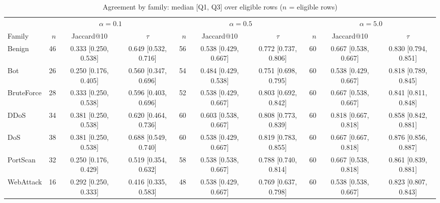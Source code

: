 \begin{table}[t]
\centering
\caption{Agreement by family: median [Q1, Q3] over eligible rows ($n$ = eligible rows)}
\label{tab:agree_family}
\footnotesize
\setlength{\tabcolsep}{3pt}
\begin{tabular}{@{}l rcc rcc rcc@{}}
\toprule
 & \multicolumn{3}{c}{$\alpha=0.1$} & \multicolumn{3}{c}{$\alpha=0.5$} & \multicolumn{3}{c}{$\alpha=5.0$}\\ %
\cmidrule(lr){2-4}\cmidrule(lr){5-7}\cmidrule(l){8-10}
Family & $n$ & Jaccard@10 & $\tau$ & $n$ & Jaccard@10 & $\tau$ & $n$ & Jaccard@10 & $\tau$\\
\midrule
Benign & 46 & 0.333 [0.250, 0.538] & 0.649 [0.532, 0.716] & 56 & 0.538 [0.429, 0.667] & 0.772 [0.737, 0.806] & 60 & 0.667 [0.538, 0.667] & 0.830 [0.794, 0.851]\\ %
Bot & 26 & 0.250 [0.176, 0.405] & 0.560 [0.347, 0.696] & 54 & 0.484 [0.429, 0.538] & 0.751 [0.698, 0.795] & 60 & 0.538 [0.429, 0.667] & 0.818 [0.789, 0.845]\\ %
BruteForce & 28 & 0.333 [0.250, 0.538] & 0.596 [0.403, 0.696] & 52 & 0.538 [0.429, 0.667] & 0.803 [0.692, 0.842] & 60 & 0.667 [0.538, 0.667] & 0.841 [0.811, 0.848]\\ %
DDoS & 34 & 0.381 [0.250, 0.538] & 0.620 [0.464, 0.736] & 60 & 0.603 [0.538, 0.667] & 0.808 [0.773, 0.839] & 60 & 0.818 [0.667, 0.818] & 0.858 [0.842, 0.881]\\ %
DoS & 38 & 0.381 [0.250, 0.538] & 0.688 [0.549, 0.740] & 60 & 0.538 [0.429, 0.667] & 0.819 [0.783, 0.855] & 60 & 0.667 [0.667, 0.818] & 0.876 [0.856, 0.887]\\ %
PortScan & 32 & 0.250 [0.176, 0.429] & 0.519 [0.354, 0.632] & 58 & 0.538 [0.538, 0.667] & 0.788 [0.740, 0.814] & 60 & 0.667 [0.538, 0.818] & 0.861 [0.839, 0.881]\\ %
WebAttack & 16 & 0.292 [0.250, 0.333] & 0.416 [0.335, 0.583] & 48 & 0.538 [0.429, 0.667] & 0.769 [0.637, 0.798] & 60 & 0.538 [0.538, 0.667] & 0.823 [0.807, 0.843]\\ %
\bottomrule
\end{tabular}
\end{table}

